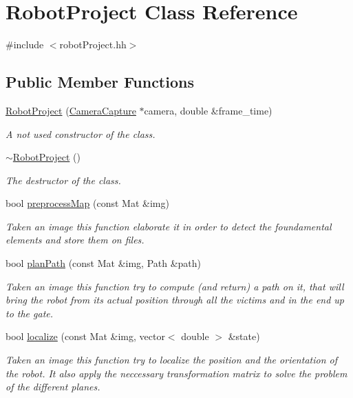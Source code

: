 \hypertarget{class_robot_project}{}\section{Robot\+Project Class Reference}
\label{class_robot_project}


{\ttfamily \#include $<$robot\+Project.\+hh$>$}

\subsection*{Public Member Functions}
\begin{DoxyCompactItemize}
\item 
\mbox{\hyperlink{class_robot_project_a3afaaa8731fb02fabaf2c47bb7c81799}{Robot\+Project}} (\mbox{\hyperlink{class_camera_capture}{Camera\+Capture}} $\ast$camera, double \&frame\+\_\+time)
\begin{DoxyCompactList}\small\item\em A not used constructor of the class. \end{DoxyCompactList}\item 
\mbox{\hyperlink{class_robot_project_a8510ebe175da3b90ffea7c88b690b4f8}{$\sim$\+Robot\+Project}} ()
\begin{DoxyCompactList}\small\item\em The destructor of the class. \end{DoxyCompactList}\item 
bool \mbox{\hyperlink{class_robot_project_a380adb448f0fcbc625df9401de3bb013}{preprocess\+Map}} (const Mat \&img)
\begin{DoxyCompactList}\small\item\em Taken an image this function elaborate it in order to detect the foundamental elements and store them on files. \end{DoxyCompactList}\item 
bool \mbox{\hyperlink{class_robot_project_ad9077931a89d2226e6675c6107adfc53}{plan\+Path}} (const Mat \&img, Path \&path)
\begin{DoxyCompactList}\small\item\em Taken an image this function try to compute (and return) a path on it, that will bring the robot from its actual position through all the victims and in the end up to the gate. \end{DoxyCompactList}\item 
bool \mbox{\hyperlink{class_robot_project_a9899c66898ccd1b638fe074797a18398}{localize}} (const Mat \&img, vector$<$ double $>$ \&state)
\begin{DoxyCompactList}\small\item\em Taken an image this function try to localize the position and the orientation of the robot. It also apply the neccessary transformation matrix to solve the problem of the different planes. \end{DoxyCompactList}\end{DoxyCompactItemize}


